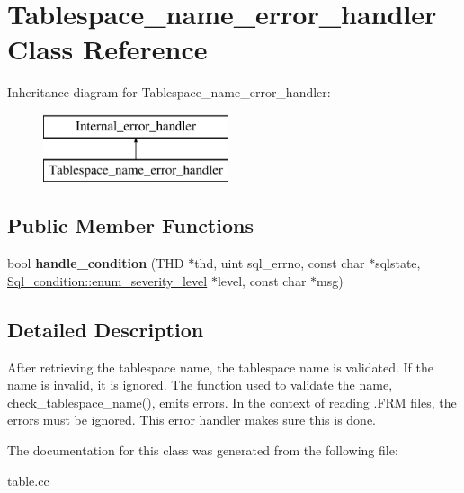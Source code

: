 \hypertarget{classTablespace__name__error__handler}{}\section{Tablespace\+\_\+name\+\_\+error\+\_\+handler Class Reference}
\label{classTablespace__name__error__handler}
Inheritance diagram for Tablespace\+\_\+name\+\_\+error\+\_\+handler\+:\begin{figure}[H]
\begin{center}
\leavevmode
\includegraphics[height=2.000000cm]{classTablespace__name__error__handler}
\end{center}
\end{figure}
\subsection*{Public Member Functions}
\begin{DoxyCompactItemize}
\item 
\mbox{\label{classTablespace__name__error__handler_a57cd0a88a6e8f8c6faa9943ea5b611f9}} 
bool {\bfseries handle\+\_\+condition} (T\+HD $\ast$thd, uint sql\+\_\+errno, const char $\ast$sqlstate, \mbox{\hyperlink{classSql__condition_ab0602581e19cddb609bfe10c44be4e83}{Sql\+\_\+condition\+::enum\+\_\+severity\+\_\+level}} $\ast$level, const char $\ast$msg)
\end{DoxyCompactItemize}


\subsection{Detailed Description}
After retrieving the tablespace name, the tablespace name is validated. If the name is invalid, it is ignored. The function used to validate the name, \textquotesingle{}check\+\_\+tablespace\+\_\+name()\textquotesingle{}, emits errors. In the context of reading .F\+RM files, the errors must be ignored. This error handler makes sure this is done. 

The documentation for this class was generated from the following file\+:\begin{DoxyCompactItemize}
\item 
table.\+cc\end{DoxyCompactItemize}
